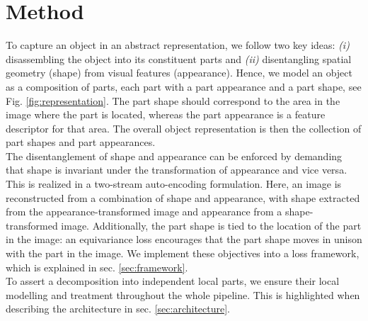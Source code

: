 \chapter{Method}

	To capture an object in an abstract representation, we follow two key ideas: \emph{(i)} disassembling the object into its constituent parts and \emph{(ii)} disentangling spatial geometry (shape) from visual features (appearance). Hence, we model an object as a composition of parts, each part with a part appearance and a part shape, see Fig. \ref{fig:representation}. The part shape should correspond to the area in the image where the part is located, whereas the part appearance is a feature descriptor for that area. The overall object representation is then the collection of part shapes and part appearances. \\
	The disentanglement of shape and appearance can be enforced by demanding that shape is invariant under the transformation of appearance and vice versa. This is realized in a two-stream auto-encoding formulation. Here, an image is reconstructed from a combination of shape and appearance, with shape extracted from the appearance-transformed image and appearance from a shape-transformed image. Additionally, the part shape is tied to the location of the part in the image: an equivariance loss encourages that the part shape moves in unison with the part in the image. We implement these objectives into a loss framework, which is explained in sec. \ref{sec:framework}. \\
	To assert a decomposition into independent local parts, we ensure their local modelling and treatment throughout the whole pipeline. This is highlighted when describing the architecture in sec. \ref{sec:architecture}.

